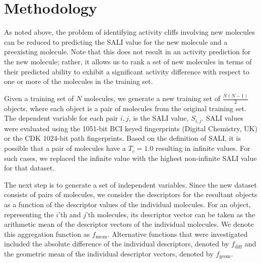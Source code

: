 \documentclass[letterpaper, 12pt]{article}
\begin{document}

\section{Methodology}
\label{sec:methodology}
As noted above, the problem of identifying activity cliffs involving new molecules can be reduced to
predicting the SALI value for the new molecule and a preexisting molecule. Note that this does not
result in an activity prediction for the new molecule; rather, it allows us to rank a set of new
molecules in terms of their predicted ability to exhibit a significant activity difference with
respect to one or more of the molecules in the training set.

Given a training set of $N$ molecules, we generate a new training set of $\frac{N(N-1)}{2}$ objects,
where each object is a pair of molecules from the original training set. The dependent variable for
each pair $i,j$, is the SALI value, $S_{i,j}$. SALI values were evaluated using the 1051-bit BCI
keyed fingerprints (Digital Chemistry, UK) or the CDK\cite{Steinbeck:2006aa,Steinbeck:2003bh}
1024-bit path fingerprints. Based on the definition of SALI, it is possible that a pair of molecules
have a $T_c = 1.0$ resulting in infinite values. For such cases, we replaced the infinite value with
the highest non-infinite SALI value for that dataset.

The next step is to generate a set of independent variables. Since the new dataset consists of pairs
of molecules, we consider the descriptors for the resultant objects as a function of the descriptor
values of the individual molecules. For an object, representing the $i$'th and $j$'th molecules, its
descriptor vector can be taken as the arithmetic mean of the descriptor vectors of the individual
molecules. We denote this aggregation function as $f_{\textrm{mean}}$. Alternative functions that
were investigated included the absolute difference of the individual descriptors, denoted by
$f_{\textrm{diff}}$ and the geometric mean of the individual descriptor vectors, denoted by
$f_{\textrm{geom}}$.
\end{document}
